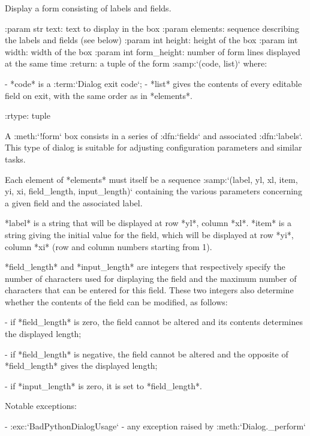 \begin{DoxyVerb}Display a form consisting of labels and fields.

:param str text:        text to display in the box
:param elements:        sequence describing the labels and
                fields (see below)
:param int height:      height of the box
:param int width:       width of the box
:param int form_height: number of form lines displayed at the
                same time
:return: a tuple of the form :samp:`({code}, {list})` where:

  - *code* is a :term:`Dialog exit code`;
  - *list* gives the contents of every editable field on exit,
    with the same order as in *elements*.

:rtype: tuple

A :meth:`!form` box consists in a series of :dfn:`fields` and
associated :dfn:`labels`. This type of dialog is suitable for
adjusting configuration parameters and similar tasks.

Each element of *elements* must itself be a sequence
:samp:`({label}, {yl}, {xl}, {item}, {yi}, {xi}, {field_length},
{input_length})` containing the various parameters concerning a
given field and the associated label.

*label* is a string that will be displayed at row *yl*, column
*xl*. *item* is a string giving the initial value for the field,
which will be displayed at row *yi*, column *xi* (row and column
numbers starting from 1).

*field_length* and *input_length* are integers that respectively
specify the number of characters used for displaying the field
and the maximum number of characters that can be entered for
this field. These two integers also determine whether the
contents of the field can be modified, as follows:

  - if *field_length* is zero, the field cannot be altered and
    its contents determines the displayed length;

  - if *field_length* is negative, the field cannot be altered
    and the opposite of *field_length* gives the displayed
    length;

  - if *input_length* is zero, it is set to *field_length*.

Notable exceptions:

  - :exc:`BadPythonDialogUsage`
  - any exception raised by :meth:`Dialog._perform`\end{DoxyVerb}
